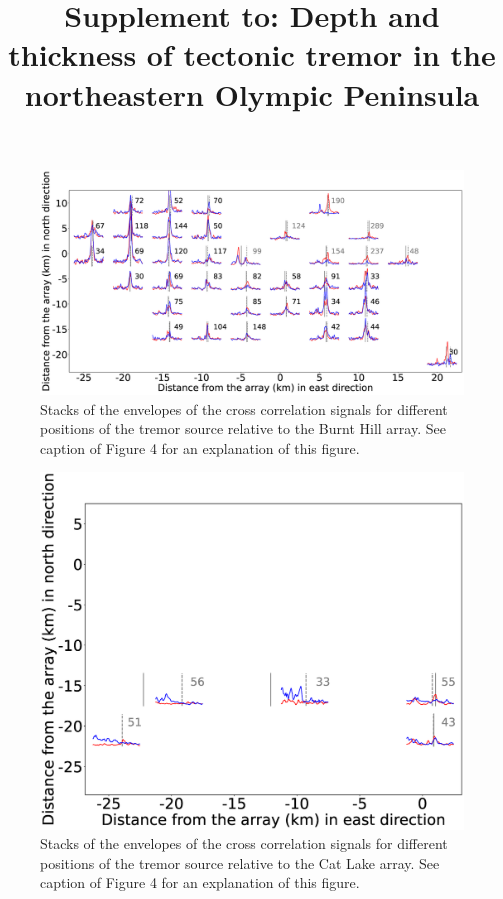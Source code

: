 \documentclass[draft]{agujournal2019}
\begin{document}
\title{Supplement to: Depth and thickness of tectonic tremor in the northeastern Olympic Peninsula}




\newpage

\begin{figure}
\noindent\includegraphics[width=\textwidth, trim={5cm 0.5cm 7.5cm 1.5cm},clip]{figures/BH_PWS_PWS_0.eps}
\caption{Stacks of the envelopes of the cross correlation signals for different positions of the tremor source relative to the Burnt Hill array. See caption of Figure 4 for an explanation of this figure.}
\label{pngfiguresample}
\end{figure}

\begin{figure}
\noindent\includegraphics[width=\textwidth, trim={1.5cm 1cm 4.5cm 1.5cm},clip]{figures/CL_PWS_PWS_0.eps}
\caption{Stacks of the envelopes of the cross correlation signals for different positions of the tremor source relative to the Cat Lake array. See caption of Figure 4 for an explanation of this figure.}
\label{pngfiguresample}
\end{figure}
\end{document}
